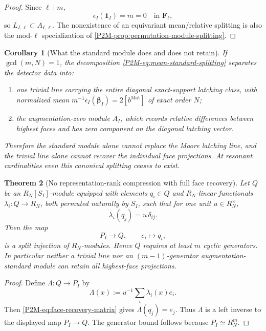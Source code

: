 \documentclass[11pt]{article}
\newtheorem{theorem}{Theorem}[section]
\newtheorem{corollary}[theorem]{Corollary}
\theoremstyle{remark}
\newcommand{\F}{\mathbf F}
\newcommand{\Mot}{\mathrm{Mot}}
\begin{document}
\begin{proof}
Since $\ell\mid m$,
\[
 \epsilon_I(\mathbf1_I)=m=0\quad\text{in }\F_\ell,
\]
so $L_{I,\ell}\subset A_{I,\ell}$.  The nonexistence of an equivariant
mean/relative splitting is also the mod-$\ell$ specialization of
\cref{P2M-prop:permutation-module-splitting}.
\end{proof}

\begin{corollary}[What the standard module does and does not retain]
\label{P2M-cor:standard-module-scope}
If $\gcd(m,N)=1$, the decomposition
\eqref{P2M-eq:mean-standard-splitting} separates the detector data into:
\begin{enumerate}[label=\textup{(\roman*)}]
\item one trivial line carrying the entire diagonal exact-support latching
      class, with normalized mean $m^{-1}\epsilon_I(\boldsymbol\beta_I)
      =2[b^{\Mot}]$ of exact order $N$;
\item the augmentation-zero module $A_I$, which records relative differences
      between highest faces and has zero component on the diagonal latching
      vector.
\end{enumerate}
Therefore the standard module alone cannot replace the Moore latching line,
and the trivial line alone cannot recover the individual face projections.
At resonant cardinalities even this canonical splitting ceases to exist.
\end{corollary}

\begin{theorem}[No representation-rank compression with full face recovery]
\label{P2M-thm:no-rank-compression-face-recovery}
Let $Q$ be an $R_N[S_I]$-module equipped with elements $q_i\in Q$ and
$R_N$-linear functionals $\lambda_i:Q\to R_N$, both permuted naturally by
$S_I$, such that for one unit $u\in R_N^\times$,
\begin{equation}\label{P2M-eq:face-recovery-matrix}
 \lambda_i(q_j)=u\,\delta_{ij}.
\end{equation}
Then the map
\[
 P_I\longrightarrow Q,
 \qquad e_i\longmapsto q_i,
\]
is a split injection of $R_N$-modules.  Hence $Q$ requires at least $m$
cyclic generators.  In particular neither a trivial line nor an
$(m-1)$-generator augmentation-standard module can retain all highest-face
projections.
\end{theorem}

\begin{proof}
Define $\Lambda:Q\to P_I$ by
\[
 \Lambda(x):=u^{-1}\sum_i\lambda_i(x)e_i.
\]
Then \eqref{P2M-eq:face-recovery-matrix} gives
$\Lambda(q_j)=e_j$.  Thus $\Lambda$ is a left inverse to the displayed map
$P_I\to Q$.  The generator bound follows because $P_I\simeq R_N^m$.
\end{proof}
\end{document}
